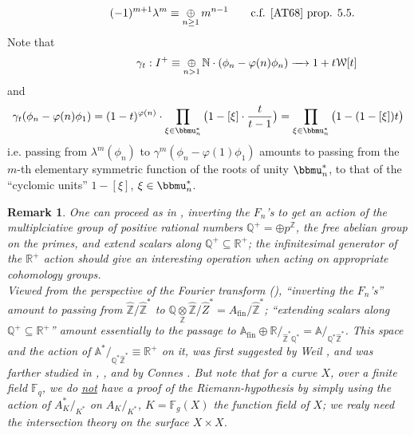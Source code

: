 \documentclass[leqno]{article}
\newcommand{\Q}{\mathbb{Q}}
\newcommand{\R}{\mathbb{R}}
\newcommand{\N}{\mathbb{N}}
\newcommand{\Z}{\mathbb{Z}}
\newcommand{\oplussum}{\mathop{\oplus}}
\newtheorem{remark}[equation]{Remark}
\numberwithin{equation}{section}
\begin{document}
  \begin{equation}
    \label{eq:13.49}
   \ \hspace{14mm}    (-1)^{m+1}\lambda^m \equiv \oplussum\limits_{n\ge 1} m^{n-1} \qquad \text{c.f. \cite{AT68} prop. 5.5.} 
  \end{equation}
Note that
  \begin{equation}
    \label{eq:13.50}
    \   \ \hspace{22mm} \gamma_t:I^+\equiv \oplussum\limits_{n>1}\N\cdot (\phi_n-\varphi(n)\phi_n)\xrightarrow{\quad} 1+t\mathcal{W}[t]
  \end{equation}
  and
  \begin{equation}
    \label{eq:13.51}
    \gamma_t(\phi_n-\varphi(n)\phi_1)=(1-t)^{\varphi(n)}\cdot \prod\limits_{\xi\in\bbmu_n^*} \big( 1-[\xi]\cdot\frac{t}{t-1}\big) = \prod\limits_{\xi\in\bbmu_n^*}\big( 1- (1-[\xi])t\big)
  \end{equation}
  i.e. passing from $\lambda^m(\phi_n)$ to $\gamma^m(\phi_n-\varphi(1)\phi_1)$ amounts to passing from the $m$-th elementary symmetric function of the roots of unity $\bbmu_n^*$, to that of the ``cyclomic units'' $1-[\xi]$, $\xi\in\bbmu_n^*$.
\begin{remark}
One can proceed as in \cite{D}, inverting the $F_{n}$'s to get an action of the
multiplciative group of positive rational numbers $\Q^{+}=\oplus p^{\Z}$, the
free abelian group on the primes, and extend scalars along $\Q^{+}\subseteq
\R^{+}$; the infinitesimal generator of the $\R^{+}$ action should give an
interesting operation when acting on appropriate cohomology groups.\\
Viewed from the perspective of the Fourier transform (),
``inverting the $F_n$'s'' amount to passing from $\hat{\Z}/\hat{\Z}^*$
to
$\mathbb{Q}\underset{\Z}{\otimes}
\hat{\Z}/\hat{Z}^*=A_{\text{fin}}/\hat{\Z}^*$; ``extending scalars
along $\mathbb{Q}^+\subseteq\R^{+}$'' amount essentially to the passage to
$\mathbb{A}_\text{fin}\oplus\R/_{\hat{\Z}^*\mathbb{Q}^*}=\mathbb{A}/_{\mathbb{Q}^*\hat{\Z}^*}$.
This space and the action of
$\mathbb{A}^*/_{\mathbb{Q}^*\hat{\Z}^*}\equiv\R^+$ on it, was first
suggested by Weil \cite{weil1966fonction}, and was farther studied in \cite{Har90}, \cite{Har01}, and by
Connes \cite{connes1999trace}. But note that for a curve $X$, over a
finite field $\mathbb{F}_q$, we do \underline{not} have a proof of the
Riemann-hypothesis by simply using the action of $A^*_{K}/_{K^*}$ on $A_{K}/_{K^*}$, $K=\mathbb{F}_g(X)$ the function field of $X$; we realy
need the intersection theory on the surface $X\times X$. 
\label{remark:12.42}
\end{remark}
\end{document}
